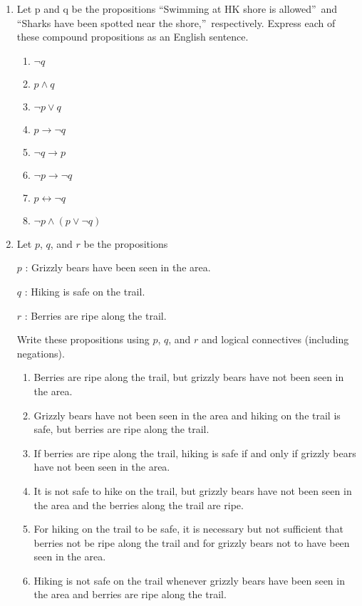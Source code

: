 \documentclass{sig-alternate-05-2015}
\begin{document}
\begin{enumerate}
\item Let p and q be the propositions \textquotedblleft Swimming at HK shore is allowed\textquotedblright\ and \textquotedblleft Sharks have been spotted
near the shore,\textquotedblright\ respectively. Express each of these compound
propositions as an English sentence.
\begin{enumerate}
	\item $\neg q$
	\item $p \wedge q$
	\item $\neg p \vee q$
	\item $p \rightarrow \neg q$
	\item $\neg q \rightarrow p$
	\item $\neg p \rightarrow \neg q$
	\item $p \leftrightarrow \neg q$
	\item $\neg p \wedge (p \vee \neg q)$
\end{enumerate}

\item Let $p$, $q$, and $r$ be the propositions

$p$ : Grizzly bears have been seen in the area.

$q$ : Hiking is safe on the trail.

$r$ : Berries are ripe along the trail.

Write these propositions using $p$, $q$, and $r$ and logical
connectives (including negations).
\begin{enumerate}
\item Berries are ripe along the trail, but grizzly bears have
not been seen in the area.
\item Grizzly bears have not been seen in the area and hiking
on the trail is safe, but berries are ripe along the
trail.
\item If berries are ripe along the trail, hiking is safe if and
only if grizzly bears have not been seen in the area.
\item It is not safe to hike on the trail, but grizzly bears have
not been seen in the area and the berries along the trail
are ripe.
\item For hiking on the trail to be safe, it is necessary but not
sufficient that berries not be ripe along the trail and
for grizzly bears not to have been seen in the area.
\item Hiking is not safe on the trail whenever grizzly bears
have been seen in the area and berries are ripe along
the trail.
\end{enumerate}


\end{enumerate}
\end{document}
